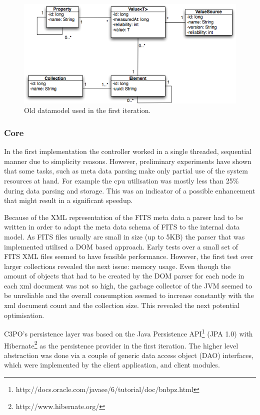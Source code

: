 \begin{figure}[htb]
\begin{center}
\includegraphics[width=5in]{figures/architecture/old_datamodel.png}
\caption{Old datamodel used in the first iteration.}
\label{fig:old_datamodel}
\end{center}
\end{figure}

\subsubsection{Core}
In the first implementation the controller worked in a single threaded, sequential manner due to simplicity reasons. However, preliminary experiments have shown that some tasks, such as meta data parsing make only partial use of the system resources at hand. For example the cpu utilisation was mostly less than 25\% during data parsing and storage. This was an indicator of a possible enhancement that might result in a significant speedup.

Because of the XML representation of the FITS meta data a parser had to be written in order to adapt the meta data schema of FITS to the internal data model. As FITS files usually are small in size (up to 5KB) the parser that was implemented utilised a DOM based approach. Early tests over a small set of FITS XML files seemed to have feasible performance. However, the first test over larger collections revealed the next issue: memory usage. Even though the amount of objects that had to be created by the DOM parser for each node in each xml document was not so high, the garbage collector of the JVM seemed to be unreliable and the overall consumption seemed to increase constantly with the xml document count and the collection size. This revealed the next potential optimisation.

C3PO's persistence layer was based on the Java Persistence API\footnote{http://docs.oracle.com/javaee/6/tutorial/doc/bnbpz.html} (JPA 1.0) with Hibernate\footnote{http://www.hibernate.org/} as the persistence provider in the first iteration. The higher level abstraction was done via a couple of generic data access object (DAO) interfaces, which were implemented by the client application, and client modules.

